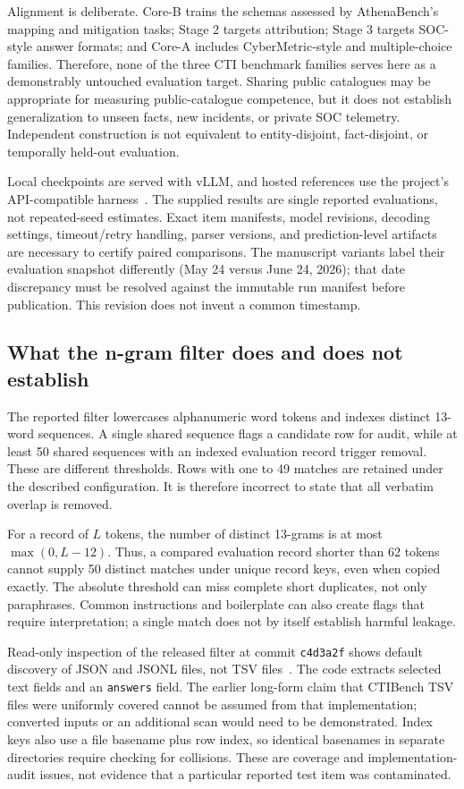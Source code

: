 \documentclass[journal]{IEEEtran}
\newcommand{\code}[1]{{\small\nolinkurl{#1}}}
\newcommand{\repostamp}{\texttt{c4d3a2f}}
\begin{document}
Alignment is deliberate. Core-B trains the schemas assessed by AthenaBench's mapping and mitigation tasks; Stage 2 targets attribution; Stage 3 targets SOC-style answer formats; and Core-A includes CyberMetric-style and multiple-choice families. Therefore, none of the three CTI benchmark families serves here as a demonstrably untouched evaluation target. Sharing public catalogues may be appropriate for measuring public-catalogue competence, but it does not establish generalization to unseen facts, new incidents, or private SOC telemetry. Independent construction is not equivalent to entity-disjoint, fact-disjoint, or temporally held-out evaluation.

Local checkpoints are served with vLLM, and hosted references use the project's API-compatible harness~\cite{kwon2023vllm,glaukopis2026software}. The supplied results are single reported evaluations, not repeated-seed estimates. Exact item manifests, model revisions, decoding settings, timeout/retry handling, parser versions, and prediction-level artifacts are necessary to certify paired comparisons. The manuscript variants label their evaluation snapshot differently (May 24 versus June 24, 2026); that date discrepancy must be resolved against the immutable run manifest before publication. This revision does not invent a common timestamp.

\subsection{What the n-gram filter does and does not establish}
The reported filter lowercases alphanumeric word tokens and indexes distinct 13-word sequences. A single shared sequence flags a candidate row for audit, while at least 50 shared sequences with an indexed evaluation record trigger removal. These are different thresholds. Rows with one to 49 matches are retained under the described configuration. It is therefore incorrect to state that all verbatim overlap is removed.

For a record of $L$ tokens, the number of distinct 13-grams is at most $\max(0,L-12)$. Thus, a compared evaluation record shorter than 62 tokens cannot supply 50 distinct matches under unique record keys, even when copied exactly. The absolute threshold can miss complete short duplicates, not only paraphrases. Common instructions and boilerplate can also create flags that require interpretation; a single match does not by itself establish harmful leakage.

Read-only inspection of the released filter at commit \repostamp{} shows default discovery of JSON and JSONL files, not TSV files~\cite{glaukopis2026software}. The code extracts selected text fields and an \code{answers} field. The earlier long-form claim that CTIBench TSV files were uniformly covered cannot be assumed from that implementation; converted inputs or an additional scan would need to be demonstrated. Index keys also use a file basename plus row index, so identical basenames in separate directories require checking for collisions. These are coverage and implementation-audit issues, not evidence that a particular reported test item was contaminated.
\end{document}
